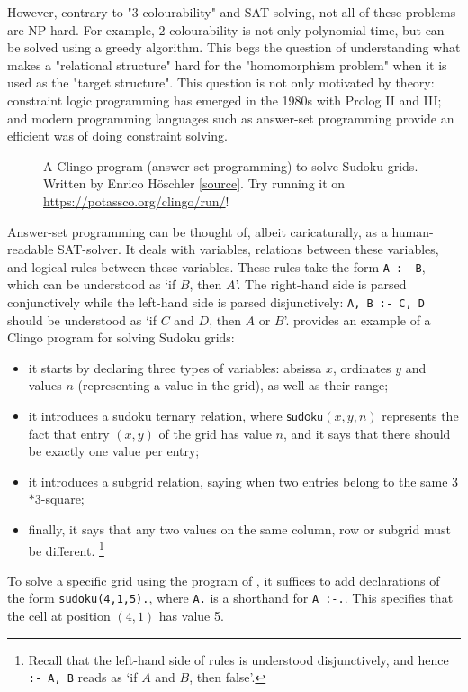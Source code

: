 However, contrary to "$3$-colourability" and SAT solving, not all of these problems are NP-hard. For example, $2$-colourability is not only polynomial-time,
but can be solved using a greedy algorithm. This begs the question of understanding what
makes a "relational structure" hard for the "homomorphism problem" when it is used
as the "target structure".
This question is not only motivated by theory: constraint logic programming has emerged in the 1980s
with Prolog II and III; and modern programming languages such as answer-set programming provide an 
efficient was of doing constraint solving.

\begin{figure}
	\centering
	
	\caption{
		\AP\label{fig:ex-sudoku-asp}
		A Clingo program (answer-set programming) to solve Sudoku grids.
		Written by Enrico Höschler
		\href{https://ddmler.github.io/asp/2018/07/10/answer-set-programming-sudoku-solver.html}{[source]}.
		Try running it on \url{https://potassco.org/clingo/run/}!
	}
\end{figure}

Answer-set programming can be thought of, albeit caricaturally, as a human-readable
SAT-solver. It deals with variables, relations between these variables,
and logical rules between these variables. These rules take the form
\lstinline|A :- B|, which can be understood as `if $B$, then $A$'.
The right-hand side is parsed conjunctively while the left-hand side is parsed disjunctively:
\lstinline|A, B :- C, D| should be understood as `if $C$ and $D$, then $A$ or $B$'.
 provides
an example of a Clingo program for solving Sudoku grids:
\begin{itemize}
	\item it starts by declaring three types of variables: absissa $x$, ordinates $y$ and values $n$ (representing a value in the grid), as well as their range;
	\item it introduces a \textsf{sudoku} ternary relation, where $\textsf{sudoku}(x,y,n)$
		represents the fact that entry $(x,y)$ of the grid has value $n$,
		and it says that there should be exactly one value per entry;
	\item it introduces a \textsf{subgrid} relation, saying when two entries
		belong to the same 3$\ast$3-square;
	\item finally, it says that any two values on the same column, row or subgrid
		must be different.%
		\footnote{Recall that the left-hand side of rules is understood disjunctively,
		and hence \lstinline|:- A, B| reads as `if $A$ and $B$, then false'.}
\end{itemize}
To solve a specific grid using the program of ,
it suffices to add declarations of the form \lstinline|sudoku(4,1,5).|,
where \lstinline|A.| is a shorthand for \lstinline|A :-.|.
This specifies that the cell at position $(4,1)$ has value 5.

